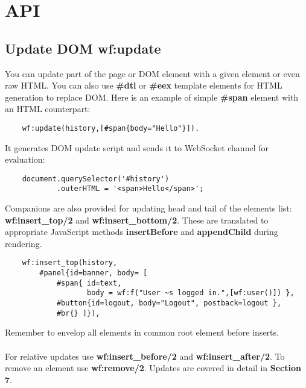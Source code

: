 \section{API}

\subsection{Update DOM \bf{wf:update}}
You can update part of the page or DOM element with a given
element or even raw HTML. You can also use {\bf \#dtl}
or {\bf \#eex} template elements for HTML generation to
replace DOM. Here is an example of simple {\bf \#span} element
with an HTML counterpart:

\vspace{1\baselineskip}
\begin{lstlisting}
    wf:update(history,[#span{body="Hello"}]).
\end{lstlisting}
\vspace{1\baselineskip}

It generates DOM update script and sends it to
WebSocket channel for evaluation:

\vspace{1\baselineskip}
\begin{lstlisting}
    document.querySelector('#history')
            .outerHTML = '<span>Hello</span>';
\end{lstlisting}
\vspace{1\baselineskip}

Companions are also provided for updating head and tail
of the elements list: {\bf wf:insert\_top/2} and
{\bf wf:insert\_bottom/2}. These are translated to appropriate
JavaScript methods {\bf insertBefore} and {\bf appendChild} during rendering.

\vspace{1\baselineskip}
\begin{lstlisting}
    wf:insert_top(history,
        #panel{id=banner, body= [
            #span{ id=text,
                   body = wf:f("User ~s logged in.",[wf:user()]) },
            #button{id=logout, body="Logout", postback=logout },
            #br{} ]}),
\end{lstlisting}
\vspace{1\baselineskip}

Remember to envelop all elements in common root element before inserts.

\paragraph{}
For relative updates use {\bf wf:insert\_before/2} and {\bf wf:insert\_after/2}.
To remove an element use {\bf wf:remove/2}.
Updates are covered in detail in {\bf Section 7}.

